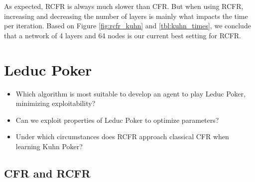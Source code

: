 \documentclass[10pt,a4paper]{article}
\begin{document}
As expected, RCFR is always much slower than CFR. But when using RCFR, increasing and decreasing the number of layers is mainly what impacts the time per iteration. Based on Figure \ref{fig:rcfr_kuhn} and \ref{tbl:kuhn_times}, we conclude that a network of 4 layers and 64 nodes is our current best setting for RCFR.


 


\section{Leduc Poker}
\begin{tcolorbox}
\begin{itemize}
\item{Which algorithm is most suitable to develop an agent to play Leduc Poker, minimizing exploitability?}
\item{Can we exploit properties of Leduc Poker to optimize parameters?}
\item{Under which circumstances does RCFR approach classical CFR when learning Kuhn Poker?}
\end{itemize}
\end{tcolorbox}

\subsection{CFR and RCFR}
\end{document}

